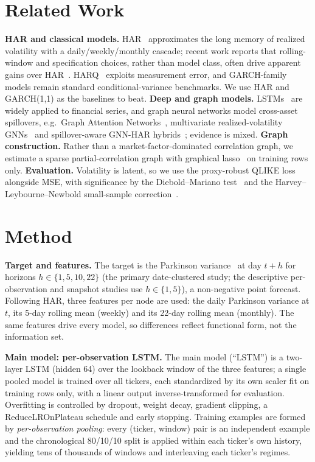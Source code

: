 \documentclass[runningheads]{llncs}
\begin{document}
\section{Related Work}
\textbf{HAR and classical models.} HAR~\cite{corsi2009} approximates the long memory of realized volatility
with a daily/weekly/monthly cascade; recent work reports that rolling-window and specification choices,
rather than model class, often drive apparent gains over HAR~\cite{audrino2025}. HARQ~\cite{harq2016}
exploits measurement error, and GARCH-family models remain standard conditional-variance benchmarks. We use
HAR and GARCH(1,1) as the baselines to beat.
\textbf{Deep and graph models.} LSTMs~\cite{lstm1997} are widely applied to financial series, and graph
neural networks model cross-asset spillovers, e.g.\ Graph Attention Networks~\cite{gat2018}, multivariate
realized-volatility GNNs~\cite{chen2022} and spillover-aware GNN-HAR hybrids~\cite{gnnhar2025}; evidence is
mixed. \textbf{Graph construction.} Rather than a market-factor-dominated correlation graph, we estimate a
sparse partial-correlation graph with graphical lasso~\cite{glasso2008} on training rows only.
\textbf{Evaluation.} Volatility is latent, so we use the proxy-robust QLIKE loss~\cite{patton2011} alongside
MSE, with significance by the Diebold--Mariano test~\cite{dm1995} and the Harvey--Leybourne--Newbold
small-sample correction~\cite{hln1997}.

\section{Method}
\textbf{Target and features.} The target is the Parkinson variance~\cite{parkinson1980} at day $t{+}h$ for
horizons $h\in\{1,5,10,22\}$ (the primary date-clustered study; the descriptive per-observation and snapshot
studies use $h\in\{1,5\}$), a non-negative point forecast. Following HAR, three features per node are used: the daily
Parkinson variance at $t$, its 5-day rolling mean (weekly) and its 22-day rolling mean (monthly). The same
features drive every model, so differences reflect functional form, not the information set.

\textbf{Main model: per-observation LSTM.} The main model (``LSTM'') is a two-layer LSTM (hidden 64) over the
lookback window of the three features; a single pooled model is trained over all tickers, each standardized
by its own scaler fit on training rows only, with a linear output inverse-transformed for evaluation.
Overfitting is controlled by dropout, weight decay, gradient clipping, a ReduceLROnPlateau schedule and early
stopping. Training examples are formed by \emph{per-observation pooling}: every (ticker, window) pair is an
independent example and the chronological 80/10/10 split is applied within each ticker's own history,
yielding tens of thousands of windows and interleaving each ticker's regimes.
\end{document}
